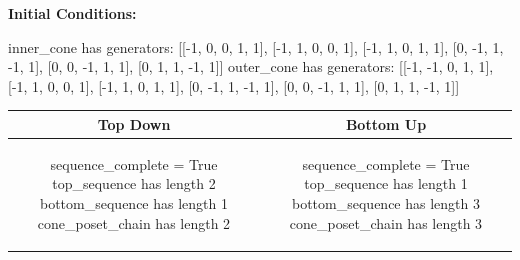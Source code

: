 \documentclass[10pt]{article}
\begin{document}
\textbf{Initial Conditions:}
\begin{SAGE}
inner_cone has generators: 
[[-1, 0, 0, 1, 1], [-1, 1, 0, 0, 1], [-1, 1, 0, 1, 1], [0, -1, 1, -1, 1], [0, 0, -1, 1, 1], [0, 1, 1, -1, 1]]
outer_cone has generators: 
[[-1, -1, 0, 1, 1], [-1, 1, 0, 0, 1], [-1, 1, 0, 1, 1], [0, -1, 1, -1, 1], [0, 0, -1, 1, 1], [0, 1, 1, -1, 1]]

\end{SAGE}
\begin{tabular}{c|c}
\textbf{Top Down} & \textbf{Bottom Up} \\ \hline  
\begin{SAGE}
sequence_complete = True
top_sequence has length 2
bottom_sequence has length 1
cone_poset_chain has length 2
\end{SAGE} 
&
\begin{SAGE}
sequence_complete = True
top_sequence has length 1
bottom_sequence has length 3
cone_poset_chain has length 3
\end{SAGE} 
\\ \hline


\end{tabular}
\end{document}
